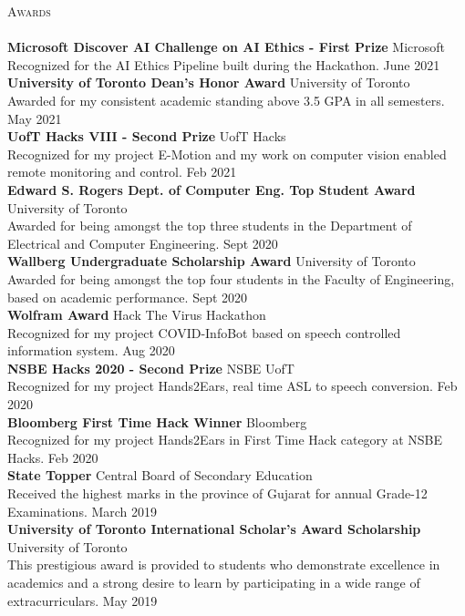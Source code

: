 \documentclass[a4paper]{article}
\newcommand{\lineunder} {
    \vspace*{-8pt} \\
    \hspace*{-18pt} \hrulefill \\
}
\newcommand{\header} [1] {
    {\hspace*{-18pt}\vspace*{6pt} \textsc{#1}}
    \vspace*{-6pt} \lineunder
}
\begin{document}
\header{Awards}
\textbf{Microsoft Discover AI Challenge on AI Ethics - First Prize} \hfill Microsoft\\
Recognized for the AI Ethics Pipeline built during the Hackathon. \hfill June 2021\\
\vspace*{2mm}
\textbf{University of Toronto Dean’s Honor Award} \hfill University of Toronto\\
Awarded for my consistent academic standing above 3.5 GPA in all semesters. \hfill May 2021\\
\vspace*{2mm}
\textbf{UofT Hacks VIII - Second Prize} \hfill UofT Hacks\\
Recognized for my project E-Motion and my work on computer vision enabled remote monitoring and
control. \hfill Feb 2021\\
\vspace*{2mm}
\textbf{Edward S. Rogers Dept. of Computer Eng. Top Student Award} \hfill University of Toronto\\
Awarded for being amongst the top three students in the Department of Electrical and Computer
Engineering. \hfill Sept 2020\\
\vspace*{2mm}
\textbf{Wallberg Undergraduate Scholarship Award} \hfill University of Toronto\\
Awarded for being amongst the top four students in the Faculty of Engineering, based on academic
performance. \hfill Sept 2020\\
\vspace*{2mm}
\textbf{Wolfram Award} \hfill Hack The Virus Hackathon\\
Recognized for my project COVID-InfoBot based on speech controlled information system. \hfill Aug 2020\\
\vspace*{2mm}
\textbf{NSBE Hacks 2020 - Second Prize} \hfill NSBE UofT\\
Recognized for my project Hands2Ears, real time ASL to speech conversion. \hfill Feb 2020\\
\vspace*{2mm}
\textbf{Bloomberg First Time Hack Winner} \hfill Bloomberg\\
Recognized for my project Hands2Ears in \textquotedbl{}First Time Hack\textquotedbl{} category at NSBE Hacks. \hfill Feb 2020\\
\vspace*{2mm}
\textbf{State Topper} \hfill Central Board of Secondary Education\\
Received the highest marks in the province of Gujarat for annual Grade-12 Examinations. \hfill March 2019\\
\vspace*{2mm}
\textbf{University of Toronto International Scholar’s Award Scholarship} \hfill University of Toronto\\
This prestigious award is provided to students who demonstrate excellence in academics and a strong desire to learn by participating in a wide range of extracurriculars. \hfill May 2019\\
\end{document}
